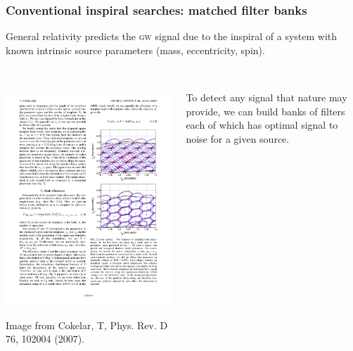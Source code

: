 \documentclass{beamer}
\begin{document}
\section[Method]{}

\begin{frame}
	\frametitle{Conventional inspiral searches: matched filter banks}
	General relativity predicts the \textsc{gw} signal due to the inspiral of a system with known intrinsic source parameters (mass, eccentricity, spin).
	\\~\\

	\begin{columns}
		\begin{column}{0.5\textwidth}
			\includegraphics[width=\textwidth]{figures/hexgrid}
			\begin{flushleft}
				\scriptsize{Image from Cokelar, T, Phys. Rev. D 76, 102004 (2007).}
			\end{flushleft}
		\end{column}
		\begin{column}{0.5\textwidth}
			To detect any signal that nature may provide, we can build banks of filters each of which has optimal signal to noise for a given source. \\~\\


\end{column}
\end{columns}
\end{frame}
\end{document}
